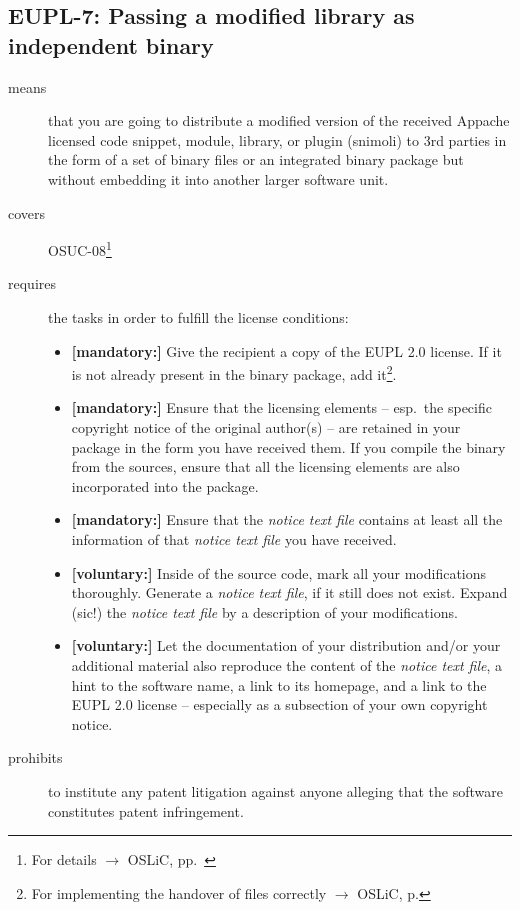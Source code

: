 \subsection{EUPL-7: Passing a modified library as independent binary}

\begin{description}
\item[means] that you are going to distribute a modified version of the received
Appache licensed code snippet, module, library, or plugin (snimoli) to 3rd
parties in the form of a set of binary files or an integrated binary package but
without embedding it into another larger software unit.
\item[covers] OSUC-08\footnote{For details $\rightarrow$ OSLiC, pp.\ \pageref{OSUC-08-DEF}}
\item[requires] the tasks in order to fulfill the license conditions:
\begin{itemize}
  
 \item \textbf{[mandatory:]} Give the recipient a copy of the EUPL 2.0
  license. If it is not already present in the binary package, add
  it\footnote{For implementing the handover of files correctly $\rightarrow$
  OSLiC, p. \pageref{DistributingFilesHint}}.
  
  \item \textbf{[mandatory:]} Ensure that the licensing elements -- esp.\ the
  specific copyright notice of the original author(s) -- are retained in your
  package in the form you have received them. If you compile the binary from the
  sources, ensure that all the licensing elements are also incorporated into the
  package.
  
  \item \textbf{[mandatory:]} Ensure that the \emph{notice text file} contains at least
  all the information of that \emph{notice text file} you have received.
   
  \item \textbf{[voluntary:]} Inside of the source code, mark all your
  modifications thoroughly. Generate a \emph{notice text file}, if it still does not
  exist. Expand (sic!) the \emph{notice text file} by a description of your
  modifications.
 
  \item \textbf{[voluntary:]} Let the documentation of your distribution and/or
  your additional material also reproduce the content of the \emph{notice text
  file}, a hint to the software name, a link to its homepage, and a link to the
  EUPL 2.0 license -- especially as a subsection of your own copyright notice.
  
\end{itemize}

\item[prohibits] to institute any patent litigation against anyone alleging that
the software constitutes patent infringement.

\end{description}

